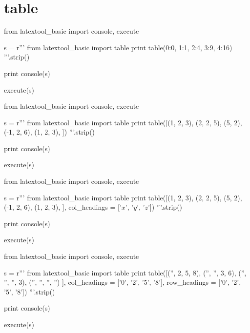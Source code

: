 \section{table}

\begin{python}
from latextool_basic import console, execute

s = r'''
from latextool_basic import table
print table({0:0, 1:1, 2:4, 3:9, 4:16})
'''.strip()

print console(s)

execute(s)

\end{python}


\begin{python}
from latextool_basic import console, execute

s = r'''
from latextool_basic import table
print table([(1, 2, 3),
             (2, 2, 5),
             (5, 2),
             (-1, 2, 6),
             (1, 2, 3),
            ])
'''.strip()

print console(s)

execute(s)

\end{python}





\begin{python}
from latextool_basic import console, execute

s = r'''
from latextool_basic import table
print table([(1, 2, 3),
             (2, 2, 5),
             (5, 2),
             (-1, 2, 6),
             (1, 2, 3),
            ],
            col_headings = ['$x$', '$y$', '$z$'])
'''.strip()

print console(s)

execute(s)

\end{python}






\begin{python}
from latextool_basic import console, execute

s = r'''
from latextool_basic import table
print table([('',  2, 5,  8),
             ('', '', 3,  6),
             ('', '', '', 3),
             ('', '', '', '')
            ],
            col_headings = ['0', '2', '5', '8'],
            row_headings = ['0', '2', '5', '8'])
'''.strip()

print console(s)

execute(s)

\end{python}






